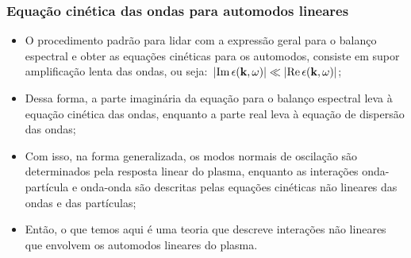 \documentclass[10pt,aspectratio=1610,lualatex]{beamer}
\begin{document}
\begin{frame}
  \frametitle{Equação cinética das ondas para automodos lineares}
  \begin{itemize}
    \item O procedimento padrão para lidar com a expressão geral para
    o balanço espectral e obter as equações cinéticas para os automodos,
    consiste em supor amplificação lenta das ondas, ou seja:\,
    $|\mbox{Im}\, \epsilon({\bf k},\omega)|\ll|\mbox{Re}\,
    \epsilon({\bf k},\omega)|$;
    \vspace{0.2cm}
    \pause
    \item Dessa forma, a parte imaginária da equação para o balanço espectral
    leva à equação cinética das ondas, enquanto a parte real leva à equação de
    dispersão das ondas;
    \vspace{0.2cm}
    \pause
    \item  Com isso, na forma generalizada, os modos normais de oscilação
    são determinados pela resposta linear do plasma, enquanto as interações
    onda-partícula e onda-onda são descritas pelas equações cinéticas não
    lineares das ondas e das partículas;
    \vspace{0.2cm}
    \pause
    \item Então, o que temos aqui é uma teoria que descreve interações
    não lineares que envolvem os automodos lineares do plasma. 
  \end{itemize}
\end{frame}
\end{document}
